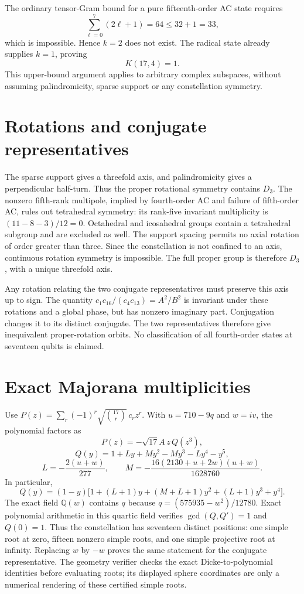 \documentclass[11pt]{article}
\begin{document}
The ordinary tensor-Gram bound for a pure fifteenth-order AC state requires
\[
 \sum_{\ell=0}^7(2\ell+1)=64\le32+1=33,
\]
which is impossible. Hence $k=2$ does not exist. The radical state already
supplies $k=1$, proving
\[
 \boxed{K(17,4)=1.}
\]
This upper-bound argument applies to arbitrary complex subspaces, without
assuming palindromicity, sparse support or any constellation symmetry.

\section{Rotations and conjugate representatives}
The sparse support gives a threefold axis, and palindromicity gives a
perpendicular half-turn. Thus the proper rotational symmetry contains $D_3$.
The nonzero fifth-rank multipole, implied by fourth-order AC and failure of
fifth-order AC, rules out tetrahedral symmetry: its rank-five invariant
multiplicity is $(11-8-3)/12=0$. Octahedral and icosahedral groups contain a
tetrahedral subgroup and are excluded as well. The support spacing permits
no axial rotation of order greater than three. Since the constellation is
not confined to an axis, continuous rotation symmetry is impossible.
The full proper group is therefore $D_3$, with a unique threefold axis.

Any rotation relating the two conjugate representatives must preserve this
axis up to sign. The quantity $c_1c_{16}/(c_4c_{13})=A^2/B^2$ is invariant
under these rotations and a global phase, but has nonzero imaginary part.
Conjugation changes it to its distinct conjugate. The two representatives
therefore give inequivalent proper-rotation orbits. No classification of
all fourth-order states at seventeen qubits is claimed.

\section{Exact Majorana multiplicities}
Use $P(z)=\sum_r(-1)^r\sqrt{\binom{17}r}\,c_rz^r$.
With $u=710-9q$ and $w=iv$, the polynomial factors as
\[
 P(z)=-\sqrt{17}A\,z\,Q(z^3),
\]
\[
 Q(y)=1+Ly+My^2-My^3-Ly^4-y^5,
\]
\[
 L=-\frac{2(u+w)}{277},\qquad
 M=-\frac{16(2130+u+2w)(u+w)}{1628760}.
\]
In particular,
\[
 Q(y)=(1-y)\bigl[1+(L+1)y+(M+L+1)y^2+(L+1)y^3+y^4\bigr].
\]
The exact field $\mathbb Q(w)$ contains $q$ because
$q=(575935-w^2)/12780$.
Exact polynomial arithmetic in this quartic field verifies
$\gcd(Q,Q')=1$ and $Q(0)=1$. Thus the constellation has seventeen
distinct positions: one simple root at zero, fifteen nonzero simple roots,
and one simple projective root at infinity. Replacing $w$ by $-w$ proves
the same statement for the conjugate representative. The geometry verifier
checks the exact Dicke-to-polynomial identities before evaluating roots;
its displayed sphere coordinates are only a numerical rendering of these
certified simple roots.
\end{document}
